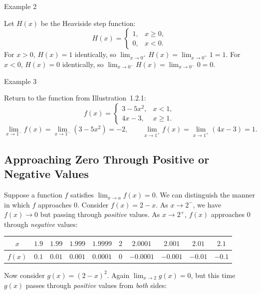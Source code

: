 \begin{examplebox}{Example 2}

Let \(H(x)\) be the Heaviside step function:
\[
H(x) = \begin{cases}
1, & x \ge 0, \\[4pt]
0, & x < 0.
\end{cases}
\]
For \(x > 0\), \(H(x) = 1\) identically, so \(\displaystyle\lim_{x \to 0^{+}} H(x) = \lim_{x \to 0^{+}} 1 = 1\). For \(x < 0\), \(H(x) = 0\) identically, so \(\displaystyle\lim_{x \to 0^{-}} H(x) = \lim_{x \to 0^{-}} 0 = 0\).
\end{examplebox}


\begin{examplebox}{Example 3}

Return to the function from Illustration~1.2.1:
\[
f(x) = \begin{cases}
3 - 5x^{2}, & x < 1, \\[4pt]
4x - 3,     & x \ge 1.
\end{cases}
\]
\[
\lim_{x \to 1^{-}} f(x) = \lim_{x \to 1^{-}} (3 - 5x^{2}) = -2,
\qquad
\lim_{x \to 1^{+}} f(x) = \lim_{x \to 1^{+}} (4x - 3) = 1.
\]
\end{examplebox}

\bigskip


\subsection*{Approaching Zero Through Positive or Negative Values}
\label{subsec:1.2.1}


Suppose a function \(f\) satisfies \(\lim_{x \to a} f(x) = 0\). We can distinguish the manner in which \(f\) approaches 0. Consider \(f(x) = 2 - x\). As \(x \to 2^{-}\), we have \(f(x) \to 0\) but passing through \emph{positive} values. As \(x \to 2^{+}\), \(f(x)\) approaches 0 through \emph{negative} values:

\begin{center}
\small
\begin{tabular}{c|cccc|c|cccc}
\(x\)      & \(1.9\) & \(1.99\) & \(1.999\) & \(1.9999\) & \(2\) & \(2.0001\) & \(2.001\) & \(2.01\) & \(2.1\) \\
\hline
\(f(x)\)   & \(0.1\) & \(0.01\) & \(0.001\) & \(0.0001\) & \(0\) & \(-0.0001\) & \(-0.001\) & \(-0.01\) & \(-0.1\)
\end{tabular}
\normalsize
\end{center}

Now consider \(g(x) = (2 - x)^{2}\). Again \(\lim_{x \to 2} g(x) = 0\), but this time \(g(x)\) passes through \emph{positive} values from \emph{both} sides:

